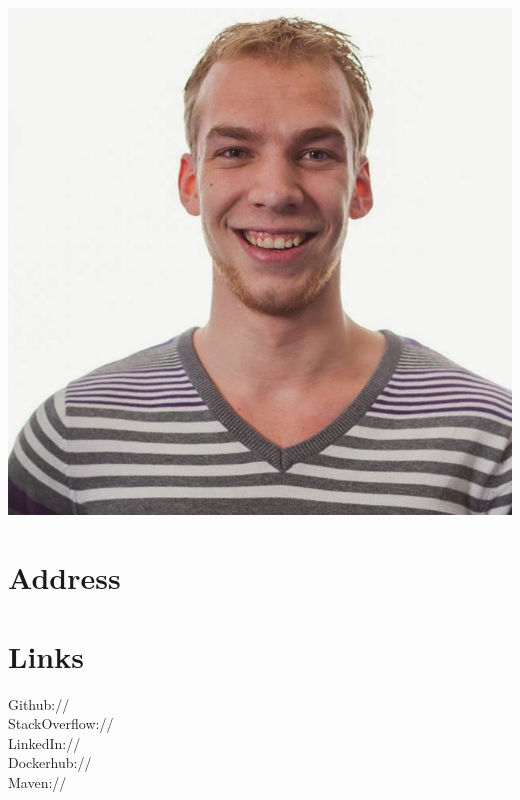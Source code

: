 \documentclass[]{deedy-resume-openfont}
\begin{document}
%
%



%
%

\begin{minipage}[t]{0.33\textwidth} 	
	
\section*{}
\vspace{-0.3in}
\includegraphics[width=.8\textwidth]{pasfoto}
		

\section{Address}
\sectionsep
	

\section{Links} 
Github:// \href{https://github.com/eernie}{} \\
StackOverflow:// \href{http://stackoverflow.com/users/1956445/eernie}{}\\
LinkedIn://  \href{https://www.linkedin.com/in/erwinoldenkamp}{}\\
Dockerhub:// \href{https://hub.docker.com/u/eernie}{}\\
Maven:// \href{https://search.maven.org/#search\%7Cga\%7C1\%7Cnl.eernie}{}
\sectionsep


\end{minipage}
\end{document}
